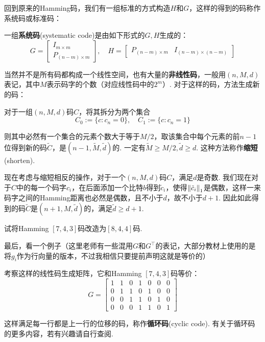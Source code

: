 回到原来的Hamming码，我们有一组标准的方式构造$H$和$G$，这样的得到的码称作系统码或标准码：
\begin{definition}[系统码]
    一组\textbf{系统码}(systematic code)是由如下形式的$G,H$生成的：
    \[
G = \left[\begin{array}{c}
I_{m \times m} \\ \hline 
P_{(n-m)\times m}
\end{array}\right] ,\quad 
H = \left[\begin{array}{c|c}
P_{(n-m)\times m} & I_{(n-m)\times (n-m)}
\end{array}\right]
    \]
\end{definition}

当然并不是所有码都构成一个线性空间，也有大量的\textbf{非线性码}，一般用$(n,M,d)$表记，其中$M$表示码字的个数（对应线性码中的$2^m$）.  对于这样的码，方法生成新的码：
\begin{definition}[缩短]
    对于一组$(n,M,d)$码$C$，将其拆分为两个集合
    \[
    C_0 := \{c : c_n = 0\}, \quad C_1 := \{c : c_n = 1\}
    \]

    则其中必然有一个集合的元素个数大于等于$M/2$，取该集合中每个元素的前$n-1$位得到新的码$\tilde{C}$，是$(n-1,\tilde{M}, \tilde{d})$的. 一定有$\tilde{M} \ge M/2, \tilde{d}\ge d$. 这种方法称作\textbf{缩短}(shorten). 
\end{definition}

现在考虑与缩短相反的操作，对于一个$(n,M,d)$码$C$，满足$d$是奇数. 我们现在对于$C$中的每一个码字$c_i$，在后面添加一个比特$b$得到$\tilde{c}_i$，使得$\left\lVert\tilde{c}_i\right\rVert_1$是偶数，这样一来码字之间的Hamming距离也必然是偶数，且不小于$d$，故不小于$d+1$. 因此如此得到的码$\tilde{C}$是$(n+1,M,\tilde{d})$的，满足$\tilde{d} \ge d+1$. 

\begin{example}
    试将Hamming $[7,4,3]$码改造为$[8,4,4]$码.
\end{example} 

最后，看一个例子（这里老师有一些混用$G$和$G^\top$的表记，大部分教材上使用的是将$g_i$作为行向量的版本，不过我相信只要提前声明这就是等价的）

\begin{example}
    考察这样的线性码生成矩阵，它和Hamming $[7,4,3]$码等价：
\[
G = \begin{bmatrix}
    1 & 1 & 0 & 1 & 0 & 0 & 0 \\
    0 & 1 & 1 & 0 & 1 & 0 & 0 \\
    0 & 0 & 1 & 1 & 0 & 1 & 0 \\
    0 & 0 & 0 & 1 & 1 & 0 & 1
\end{bmatrix}
\]
\end{example}


这样满足每一行都是上一行的位移的码，称作\textbf{循环码}(cyclic code). 有关于循环码的更多内容，若有兴趣请自行查阅.  